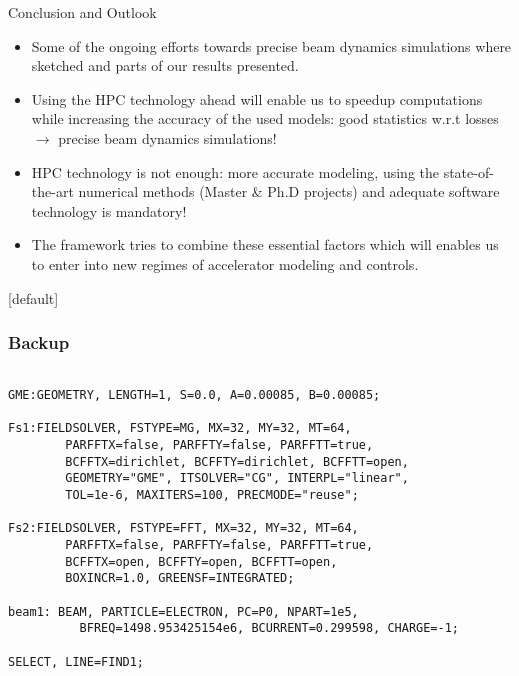 \documentclass[xcolor=pdftex,table,10pt,yellow,mathserif]{beamer}
\begin{document}
\begin{frame}{Conclusion and  Outlook}{}

\begin{itemize}
\item Some of the ongoing efforts towards precise beam dynamics simulations where sketched and parts of our results presented.
\item Using the HPC technology ahead will enable us to speedup computations while increasing the accuracy of the used models: good statistics w.r.t losses $\rightarrow $ precise beam dynamics simulations!
\item HPC technology is not enough: more accurate modeling, using the state-of-the-art numerical methods (Master \& Ph.D projects) and adequate software technology is mandatory! 

\item The \opal framework tries to combine these essential factors which will enables us to enter into
new regimes of accelerator modeling and controls.

\end{itemize}
\end{frame}






[default]

	\begin{frame}
	  	\frametitle{Backup}
		\begin{center}
		\end{center}
	\end{frame}





%
%

\begin{frame}[fragile]
\begin{block}{}
\begin{verbatim}

GME:GEOMETRY, LENGTH=1, S=0.0, A=0.00085, B=0.00085;

Fs1:FIELDSOLVER, FSTYPE=MG, MX=32, MY=32, MT=64, 
        PARFFTX=false, PARFFTY=false, PARFFTT=true,
        BCFFTX=dirichlet, BCFFTY=dirichlet, BCFFTT=open, 
        GEOMETRY="GME", ITSOLVER="CG", INTERPL="linear",
        TOL=1e-6, MAXITERS=100, PRECMODE="reuse";

Fs2:FIELDSOLVER, FSTYPE=FFT, MX=32, MY=32, MT=64, 
        PARFFTX=false, PARFFTY=false, PARFFTT=true,
        BCFFTX=open, BCFFTY=open, BCFFTT=open,
        BOXINCR=1.0, GREENSF=INTEGRATED;

beam1: BEAM, PARTICLE=ELECTRON, PC=P0, NPART=1e5, 
	      BFREQ=1498.953425154e6, BCURRENT=0.299598, CHARGE=-1;

SELECT, LINE=FIND1;
\end{verbatim}
\end{block}
\end{frame}
\end{document}
